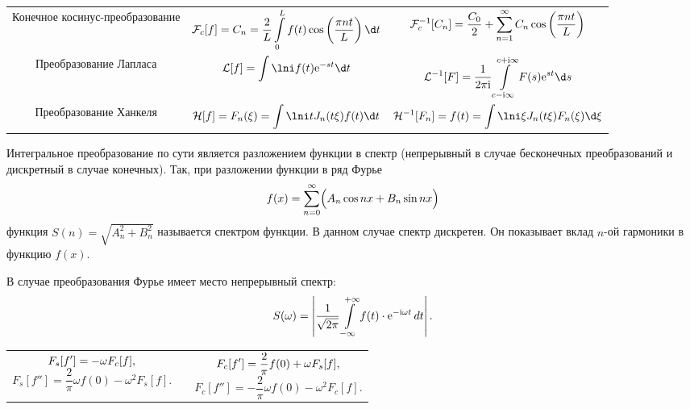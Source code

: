 \begin{table}[h!]
\begin{tabular}{|C{.17}|C{.4}|C{.4}|}
        \) \\ \hline
        Конечное косинус-преобразование &
        \( \ds
            \mathcal{F}_c[f] = C_n = \frac{2}{L}\int\limits_0^L f(t)\cos\left(
            \frac{\pi nt}{L}\right)\d t
        \)
        &
        \( \displaystyle
            \mathcal{F}_c^{-1}[C_n] = \frac{C_0}{2} + \sum\limits_{n=1}^\infty
            C_n\cos\left(\frac{\pi nt}{L}\right)
        \) \\ \hline
        Преобразование Лапласа &
        \( \ds
            \mathcal{L}[f] = \int\lni f(t)\e^{-st}\d t
        \)
        &
        \( \ds
            \mathcal{L}^{-1}[F] = \frac{1}{2\pi\i}
            \int\limits_{c-\i\infty}^{c+\i\infty}F(s)\e^{st}\d s
        \) \\ \hline
        Преобразование Ханкеля &
        \( \ds
            \mathcal{H}[f] = F_n(\xi) = \int\lni tJ_n(t\xi)f(t)\d t
        \)
        &
        \( \ds
            \mathcal{H}^{-1}[F_n] = f(t) = \int\lni \xi J_n(t\xi)F_n(\xi)\d\xi
        \) \\ \hline
    \end{tabular}
\end{table}

Интегральное преобразование по сути является разложением функции в спектр
(непрерывный в случае бесконечных преобразований и дискретный в случае
конечных). Так, при разложении функции в ряд Фурье
\[
   f(x) = \sum\limits_{n=0}^\infty \Bigl(A_n\cos nx + B_n\sin nx\Bigr)
\]
функция \( S(n) = \sqrt{A_n^2 + B_n^2} \) называется спектром функции. В данном
случае спектр дискретен. Он показывает вклад \( n \)-ой гармоники в функцию
\( f(x) \).

В случае преобразования Фурье имеет место непрерывный спектр:
\[
    S(\omega) = \left|\frac{1}{\sqrt{2\pi}}\int\limits_{-\infty}^{+\infty} f(t)
    \cdot\mathrm{e}^{-\mathrm{i}\omega t}\,dt\right|.
\]

\begin{table}[h!]
    \begin{tabular}{C{.47}cC{.47}}
        \( \displaystyle
            F_s[f'] = -\omega F_c[f],
        \)
        \[
            F_s[f''] = \frac{2}{\pi}\omega f(0) - \omega^2 F_s[f].
        \] & \hfill &
        \( \displaystyle
            F_c[f'] = \frac{2}{\pi}f(0) + \omega F_s[f],
        \)
        \[
            F_c[f''] = -\frac{2}{\pi}\omega f(0) - \omega^2 F_c[f].
        \] 
    \end{tabular}
\end{table}
\newpage
